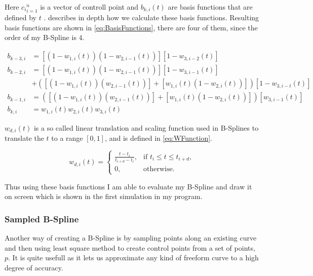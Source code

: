 \documentclass[a4paper,12pt]{extarticle}
\begin{document}
Here ${c_i}_{i=1}^n$ is a vector of controll point and $b_{k,i}(t)$ are basis functions that are defined by $t$ \citep[Chap 5.5.1]{Laksa2012}. \citep[Chap 5.5.3]{Laksa2012} describes in depth how we calculate these basis functions. Resulting basis functions are shown in \cref{eq:BasisFunctions}, there are four of them, since the order of my B-Spline is $4$.

\begin{equation}
\begin{split}
b_{k-3,i} &= \left[ \left( 1-w_{1,i}(t) \right) \left( 1-w_{2,i-1}(t) \right) \right] \left[ 1-w_{3,i-2}(t) \right]\\
b_{k-2,i} &= \left[ \left( 1-w_{1,i}(t) \right) \left( 1-w_{2,i-1}(t) \right) \right] \left[ 1-w_{3,i-1}(t) \right]\\ &+ \left( \left[ \left( 1-w_{1,i}(t) \right) \left( w_{2,i-1}(t) \right) \right] + \left[ w_{1,i}(t) \left( 1-w_{2,i}(t) \right) \right] \right) \left[ 1-w_{3,i-t}(t) \right]\\
b_{k-1,i} &= \left( \left[ \left( 1-w_{1,i}(t) \right) \left( w_{2,i-1}(t) \right) \right] + \left[ w_{1,i}(t) \left( 1-w_{2,i}(t) \right) \right] \right) \left[ w_{3,i-1}(t) \right]\\
b_{k,i} &= w_{1,i}(t) w_{2,i}(t) w_{3,i}(t)
\label{eq:BasisFunctions}
\end{split}
\end{equation}

$w_{d,i}(t)$ is a so called linear translation and scaling function used in B-Splines to translate the $t$ to a range $[0,1]$, and is defined in \cref{eq:WFunction}.

\begin{equation}
  w_{d,i}(t) = 		
  \begin{cases}
    \frac{t-t_i}{t_{i+d} - t_i}, & \text{if } t_i \leq t \leq t_{i+d},\\
    0, & \text{otherwise.}
  \end{cases}
  \label{eq:WFunction}
\end{equation}

Thus using these basis functions I am able to evaluate my B-Spline and draw it on screen which is shown in the first simulation in my program.

\subsubsection{Sampled B-Spline}
Another way of creating a B-Spline is by sampling points along an existing curve and then using least square method to create control points from a set of points, $p$. It is quite usefull as it lets us approximate any kind of freeform curve to a high degree of accuracy.
\end{document}
